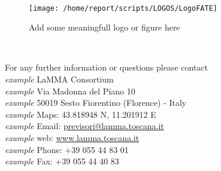
\clearpage

\begin{center}
\HRule \\[0.4cm]
\begin{figure}[htbp]
\centering
{\texttt{[image: /home/report/scripts/LOGOS/LogoFATE]}}
\caption{Add some meaningfull logo or figure here}
\end{figure}
\HRule \\[0.4cm]
\end{center}

\vspace{5.55cm}
\begin{flushright}
\large{For any further information or questions please contact
\\\textit{example} LaMMA Consortium
\\\textit{example} Via Madonna del Piano 10
\\\textit{example} 50019 Sesto Fiorentino (Florence) - Italy
\\\textit{example} Maps: 43.818948 N, 11.201912 E
\\\textit{example} Email: \href{mailto:previsori@lamma.toscana.it}{previsori@lamma.toscana.it}
\\\textit{example} web: \href{www.lamma.toscana.it}{www.lamma.toscana.it}
\\\textit{example} Phone: +39 055 44 83 01
\\\textit{example} Fax: +39 055 44 40 83}
\end{flushright}




